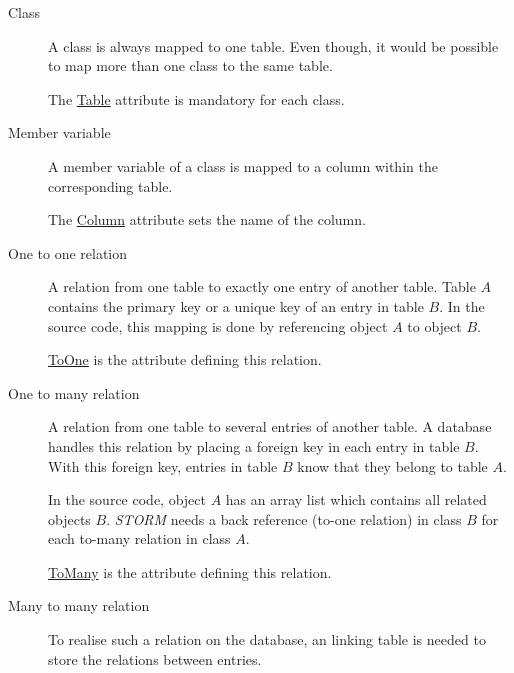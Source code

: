 		\begin{description}
			\item[Class]                     A class is always mapped to one table. Even though, it would be possible to map 
			                                 more than one class to the same table. 
			                                 
			                                 The \hyperlink{TableAttribute}{Table} attribute is mandatory for each class.
			\item[Member variable]           A member variable of a class is mapped to a column within 
			                                 the corresponding table.
			                                 
			                                 The \hyperlink{ColumnAttribute}{Column} attribute sets the name of the 
			                                 column.
			\item[One to one relation]       A relation from one table to exactly one entry of another table. Table 
			                                 $A$ contains the primary key or a unique key of an entry in table $B$.
			                                 In the source code, this mapping is done by referencing object $A$ to object $B$.
			                                 
			                                 \hyperlink{ToOneAttribute}{ToOne} is the attribute defining this relation.
			\item[One to many relation]      A relation from one table to several entries of another table. 
			                                 A database handles this relation by placing a foreign key in each entry
			                                 in table $B$. With this foreign key, entries in table $B$ know that they belong
			                                 to table $A$.

			                                 In the source code, object $A$ has an array list which contains all related 
			                                 objects $B$. \textit{STORM} needs a back reference (to-one relation) in class 
			                                 $B$ for each to-many relation in class $A$.
			                                 
			                                 \hyperlink{ToManyAttribute}{ToMany} is the attribute defining this relation.
			\item[Many to many relation]     To realise such a relation on the database, an 
				                               linking table is needed to store the relations between entries.


\end{description}
